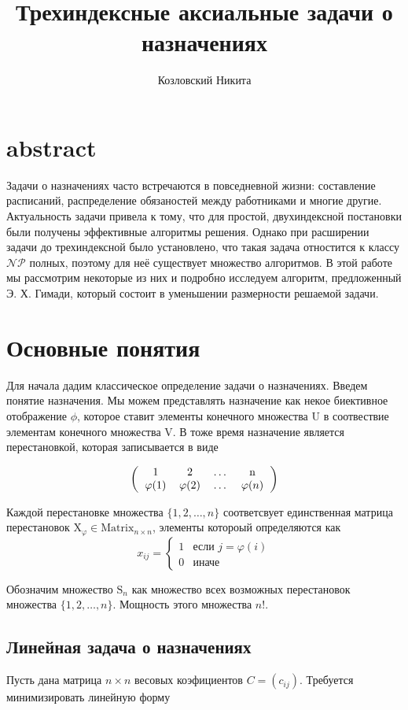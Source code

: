 \documentclass[10pt,a4paper]{article}
\author{Козловский Никита}
\title{Трехиндексные аксиальные задачи о назначениях}
\begin{document}
\section{abstract}
Задачи о назначениях часто встречаются в повседневной жизни: составление расписаний,
распределение обязаностей между работниками и многие другие. Актуальность задачи
привела к тому, что для простой, двухиндексной постановки были получены эффективные
алгоритмы решения. Однако при расширении задачи до трехиндексной было установлено, что
такая задача отностится к классу $\mathcal{NP}$ полных, поэтому для неё существует множество
алгоритмов. В этой работе мы рассмотрим некоторые из них и подробно исследуем алгоритм, предложенный
Э. Х. Гимади, который состоит в уменьшении размерности решаемой задачи.

\section{Основные понятия}
Для начала дадим классическое определение задачи о назначениях.
Введем понятие назначения. Мы можем
представлять назначение как некое биективное отображение $\phi$, которое ставит
элементы конечного множества $\mathrm{U}$ в соотвествие элементам конечного
множества $\mathrm{V}$. В тоже время назначение является перестановкой, которая записывается
в виде

\[
\left (
  \begin{tabular}{cccc}
  1 & 2 & \ldots & n\\
  $\varphi (1)$ & $\varphi (2)$ & \ldots & $\varphi (n)$
  \end{tabular}
\right )
\]

Каждой перестановке множества $\{1, 2, \ldots , n \}$ соответсвует единственная матрица
перестановок $\mathrm{X}_\varphi \in \mathrm{Matrix}_{n \times n}$, элементы котороый определяются как
\[
x_{ij} =
 \begin{cases}
   1 & \text{если } j = \varphi(i) \\
   0 & \text{иначе}
 \end{cases}
\]

Обозначим множество $\mathrm{S}_n$ как множество всех возможных перестановок множества
 $\{1, 2, \ldots , n \}$. Мощность этого множества $n!$.

\subsection{Линейная задача о назначениях}
Пусть дана матрица $n \times n$ весовых коэфициентов $C = (c_{ij})$.
Требуется минимизировать линейную форму
\end{document}

